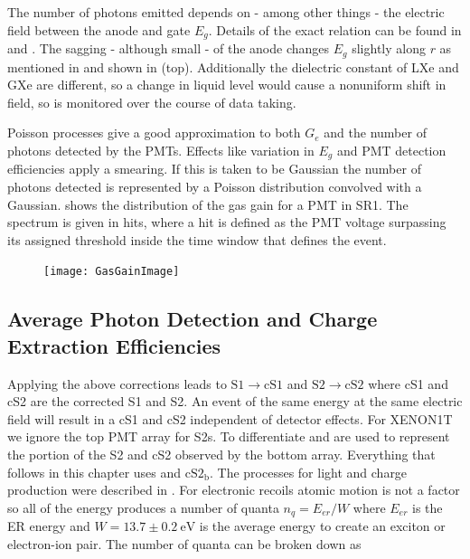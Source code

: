 The number of photons emitted depends on - among other things - the electric field between the anode and gate $E_g$.  Details of the
exact relation can be found in  and .  The sagging - although small - of the
anode changes $E_g$ slightly along $r$ as mentioned in  and shown in
 (top).  Additionally the dielectric constant of LXe and GXe are different, so a change in liquid level
would cause a nonuniform shift in field, so is monitored over the course of data taking.

Poisson processes give a good approximation to both $G_e$ and the number of photons detected by the PMTs.  Effects like variation in $E_g$
and PMT detection efficiencies apply a smearing.  If this is taken to be Gaussian the number of photons detected is represented by a
Poisson distribution convolved with a Gaussian.   shows the distribution of
the gas gain for a PMT in SR1.  The spectrum is given in hits, where a hit is defined as the PMT voltage surpassing its assigned threshold
inside the time window that defines the event.

\begin{figure}
\centering
\texttt{[image: GasGainImage]}
\label{fig:calibrations_single_electron_gain_num_photons}
\end{figure}



\subsection{Average Photon Detection and Charge Extraction Efficiencies}
\label{subsec:det_char_photon_charge_efficiencies}
Applying the above corrections leads to $\mathrm{S1} \rightarrow \mathrm{cS1}$ and $\mathrm{S2} \rightarrow \mathrm{cS2}$ where cS1 and
cS2 are the corrected S1 and S2.  An event of the same energy at the same electric field will result in a cS1 and cS2 independent of
detector effects.  For XENON1T we ignore the top PMT array for S2s.  To differentiate \stwob and \cstwob are used to represent the portion
of the S2 and cS2 observed by the bottom array.  Everything that follows in this chapter uses \stwob and $\mathrm{cS2_b}$.  The processes
for light and charge production were described in .  For electronic recoils atomic motion is
not a factor so all of the energy produces a number of quanta $n_q = E_{er} / W$ where $E_{er}$ is the ER energy and
$W = 13.7 \pm 0.2\ \mathrm{eV}$ is the average energy to create an exciton or electron-ion pair.  The number of quanta can be broken
down as

